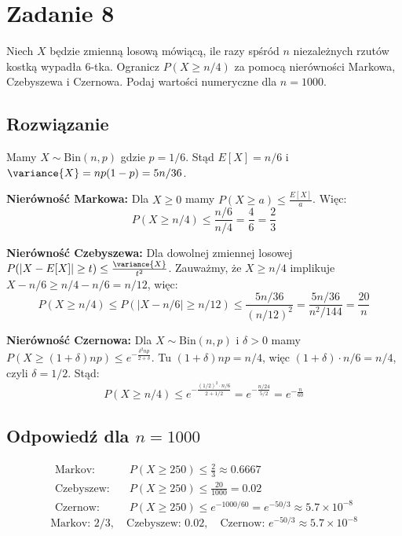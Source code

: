 \section{Zadanie 8}
Niech \(X\) będzie zmienną losową mówiącą, ile razy spśród \(n\) niezależnych rzutów
kostką wypadła 6-tka. Ogranicz \(P(X \geq n/4)\) za pomocą nierówności Markowa,
Czebyszewa i Czernowa. Podaj wartości numeryczne dla \(n = 1000\).

\subsection*{Rozwiązanie}
Mamy \(X \sim \text{Bin}(n, p)\) gdzie \(p = 1/6\). Stąd \(E[X] = n/6\) i \(\variance{X} = np(1-p) = 5n/36\).

\textbf{Nierówność Markowa:}
Dla \(X \geq 0\) mamy \(P(X \geq a) \leq \frac{E[X]}{a}\). Więc:
\[
	P(X \geq n/4) \leq \frac{n/6}{n/4} = \frac{4}{6} = \frac{2}{3}
\]

\textbf{Nierówność Czebyszewa:}
Dla dowolnej zmiennej losowej \(P(|X - E[X]| \geq t) \leq \frac{\variance{X}}{t^2}\).
Zauważmy, że \(X \geq n/4\) implikuje \(X - n/6 \geq n/4 - n/6 = n/12\), więc:
\[
	P(X \geq n/4) \leq P(|X - n/6| \geq n/12) \leq \frac{5n/36}{(n/12)^2} = \frac{5n/36}{n^2/144} = \frac{20}{n}
\]

\textbf{Nierówność Czernowa:}
Dla \(X \sim \text{Bin}(n,p)\) i \(\delta > 0\) mamy \(P(X \geq (1+\delta)np) \leq e^{-\frac{\delta^2 np}{2+\delta}}\).
Tu \((1+\delta)np = n/4\), więc \((1+\delta) \cdot n/6 = n/4\), czyli \(\delta = 1/2\). Stąd:
\[
	P(X \geq n/4) \leq e^{-\frac{(1/2)^2 \cdot n/6}{2 + 1/2}} = e^{-\frac{n/24}{5/2}} = e^{-\frac{n}{60}}
\]

\subsection*{Odpowiedź dla \(n=1000\)}
\begin{align*}
	\text{Markov:}    & \quad P(X \geq 250) \leq \frac{2}{3} \approx 0.6667                          \\
	\text{Czebyszew:} & \quad P(X \geq 250) \leq \frac{20}{1000} = 0.02                              \\
	\text{Czernow:}   & \quad P(X \geq 250) \leq e^{-1000/60} = e^{-50/3} \approx 5.7 \times 10^{-8}
\end{align*}
\[
	\boxed{\text{Markov: } 2/3, \quad \text{Czebyszew: } 0.02, \quad \text{Czernow: } e^{-50/3} \approx 5.7 \times 10^{-8}}
\]
